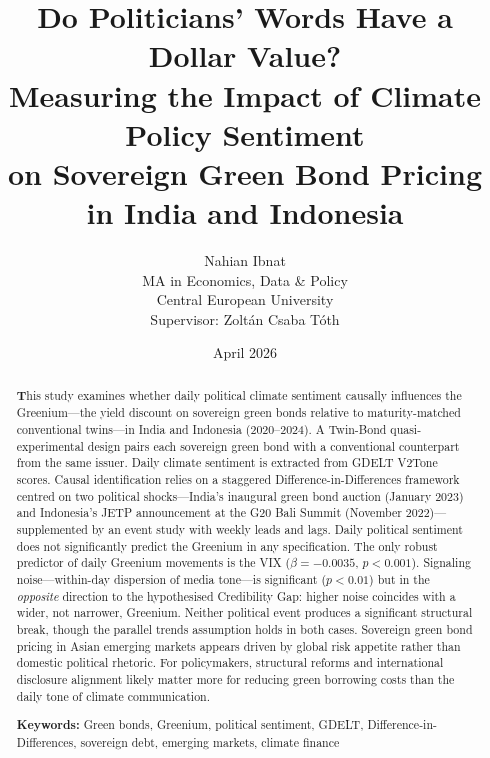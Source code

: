 \documentclass[12pt,a4paper]{article}
\title{%
  \textbf{Do Politicians' Words Have a Dollar Value?} \\[0.5em]
  \Large Measuring the Impact of Climate Policy Sentiment \\
  on Sovereign Green Bond Pricing in India and Indonesia%
}
\author{%
  Nahian Ibnat \\[0.3em]
  \normalsize MA in Economics, Data \& Policy \\
  \normalsize Central European University \\[0.5em]
  \normalsize Supervisor: Zolt\'{a}n Csaba T\'{o}th%
}
\date{April 2026}
\begin{document}
\maketitle
\thispagestyle{empty}
\newpage


\begin{abstract}
\noindent
\textbf This study examines whether daily political climate sentiment causally influences the Greenium---the yield discount on sovereign green bonds relative to maturity-matched conventional twins---in India and Indonesia (2020--2024). A Twin-Bond quasi-experimental design pairs each sovereign green bond with a conventional counterpart from the same issuer. Daily climate sentiment is extracted from GDELT V2Tone scores. Causal identification relies on a staggered Difference-in-Differences framework centred on two political shocks---India's inaugural green bond auction (January 2023) and Indonesia's JETP announcement at the G20 Bali Summit (November 2022)---supplemented by an event study with weekly leads and lags. Daily political sentiment does not significantly predict the Greenium in any specification. The only robust predictor of daily Greenium movements is the VIX ($\beta = -0.0035$, $p < 0.001$). Signaling noise---within-day dispersion of media tone---is significant ($p < 0.01$) but in the \textit{opposite} direction to the hypothesised Credibility Gap: higher noise coincides with a wider, not narrower, Greenium. Neither political event produces a significant structural break, though the parallel trends assumption holds in both cases. Sovereign green bond pricing in Asian emerging markets appears driven by global risk appetite rather than domestic political rhetoric. For policymakers, structural reforms and international disclosure alignment likely matter more for reducing green borrowing costs than the daily tone of climate communication.

\vspace{0.5em}
\noindent\textbf{Keywords:} Green bonds, Greenium, political sentiment, GDELT, Difference-in-Differences, sovereign debt, emerging markets, climate finance
\end{abstract}



\end{document}
